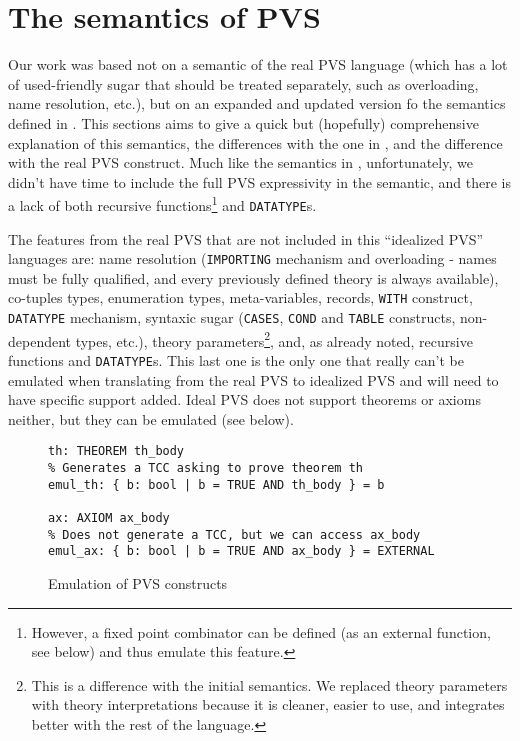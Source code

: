 \documentclass[utf8,a4paper]{article}
\begin{document}
\section{The semantics of PVS}
\label{sec:sem}

Our work was based not on a semantic of the real PVS language (which
has a lot of used-friendly sugar that should be treated separately,
such as overloading, name resolution, etc.), but on an expanded and
updated version fo the semantics defined in
\cite{PVS-Semantics:TR}. This sections aims to give a quick but
(hopefully) comprehensive explanation of this semantics, the
differences with the one in \cite{PVS-Semantics:TR}, and the
difference with the real PVS construct. Much like the semantics in
\cite{PVS-Semantics:TR}, unfortunately, we didn't have time to include
the full PVS expressivity in the semantic, and there is a lack of both
recursive functions\footnote{However, a fixed point combinator can be
  defined (as an external function, see below) and thus emulate this
  feature.} and \verb!DATATYPE!s.

The features from the real PVS that are not included in this
``idealized PVS'' languages are: name resolution (\verb!IMPORTING!
mechanism and overloading - names must be fully qualified, and every
previously defined theory is always available), co-tuples types,
enumeration types, meta-variables, records, \verb!WITH! construct,
\verb!DATATYPE!  mechanism, syntaxic sugar (\verb!CASES!, \verb!COND!
and \verb!TABLE!  constructs, non-dependent types, etc.), theory
parameters\footnote{This is a difference with the initial
  semantics. We replaced theory parameters with theory interpretations
  because it is cleaner, easier to use, and integrates better with the
  rest of the language.}, and, as already noted, recursive
functions and \verb!DATATYPE!s. This last one is the only one that
really can't be emulated when translating from the real PVS to
idealized PVS and will need to have specific support added. Ideal PVS
does not support theorems or axioms neither, but they can be emulated
(see below).

\begin{figure}
  \centering
  \begin{verbatim}
th: THEOREM th_body
% Generates a TCC asking to prove theorem th
emul_th: { b: bool | b = TRUE AND th_body } = b

ax: AXIOM ax_body
% Does not generate a TCC, but we can access ax_body
emul_ax: { b: bool | b = TRUE AND ax_body } = EXTERNAL
  \end{verbatim}
  \caption{Emulation of PVS constructs}
  \label{fig:emul}
\end{figure}
\end{document}
